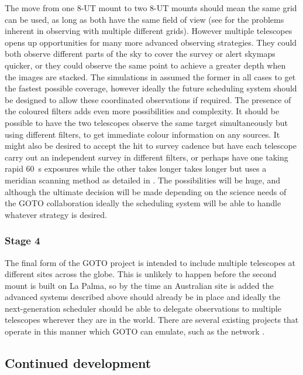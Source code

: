 \begin{colsection}
\begin{colsection}
The move from one 8-UT mount to two 8-UT mounts should mean the same grid can be used, as long as both have the same field of view (see  for the problems inherent in observing with multiple different grids). However multiple telescopes opens up opportunities for many more advanced observing strategies. They could both observe different parts of the sky to cover the survey or alert skymaps quicker, or they could observe the same point to achieve a greater depth when the images are stacked. The simulations in  assumed the former in all cases to get the fastest possible coverage, however ideally the future scheduling system should be designed to allow these coordinated observations if required. The presence of the coloured filters adds even more possibilities and complexity. It should be possible to have the two telescopes observe the same target simultaneously but using different filters, to get immediate colour information on any sources. It might also be desired to accept the hit to survey cadence but have each telescope carry out an independent survey in different filters, or perhaps have one taking rapid \SI{60}{\second} exposures while the other takes longer takes longer but uses a meridian scanning method as detailed in . The possibilities will be huge, and although the ultimate decision will be made depending on the science needs of the GOTO collaboration ideally the scheduling system will be able to handle whatever strategy is desired.

\subsubsection{Stage 4}

The final form of the GOTO project is intended to include multiple telescopes at different sites across the globe. This is unlikely to happen before the second mount is built on La Palma, so by the time an Australian site is added the advanced systems described above should already be in place and ideally the next-generation scheduler should be able to delegate observations to multiple telescopes wherever they are in the world. There are several existing projects that operate in this manner which GOTO can emulate, such as the  network \citep{LCO_scheduling}.

\end{colsection}

\newpage
\subsection{Continued development}
\label{sec:software_future}
\begin{colsection}


\end{colsection}
\end{colsection}
